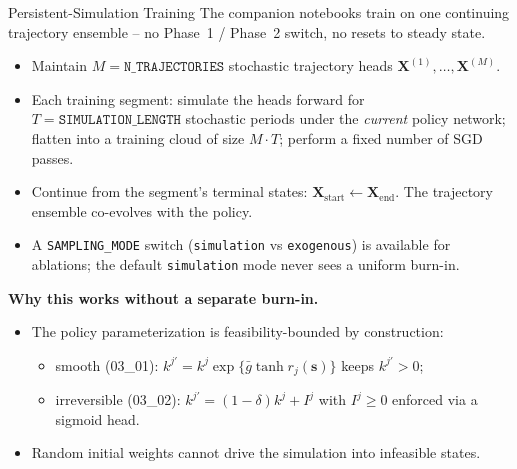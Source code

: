 \documentclass[aspectratio=169,11pt]{beamer}
\newcommand{\emphc}[1]{\textcolor{harvardcrimson}{#1}}
\begin{document}
\begin{frame}{Persistent-Simulation Training}
The companion notebooks train on \emphc{one continuing trajectory ensemble} -- no Phase~1 / Phase~2 switch, no resets to steady state.

\vspace{0.15em}
\begin{itemize}
    \item Maintain $M = \texttt{N\_TRAJECTORIES}$ stochastic trajectory heads $\bm{X}^{(1)}, \ldots, \bm{X}^{(M)}$.
    \item Each \emphc{training segment}: simulate the heads forward for $T = \texttt{SIMULATION\_LENGTH}$ stochastic periods under the \emph{current} policy network; flatten into a training cloud of size $M\!\cdot\!T$; perform a fixed number of SGD passes.
    \item Continue from the segment's terminal states: $\bm{X}_{\mathrm{start}} \leftarrow \bm{X}_{\mathrm{end}}$. The trajectory ensemble \emphc{co-evolves} with the policy.
    \item A \texttt{SAMPLING\_MODE} switch (\texttt{simulation} vs \texttt{exogenous}) is available for ablations; the default \texttt{simulation} mode never sees a uniform burn-in.
\end{itemize}

\vspace{0.15em}
\textbf{Why this works without a separate burn-in.}
\begin{itemize}
    \item The policy parameterization is feasibility-bounded by construction:
    \begin{itemize}\itemsep1pt
        \item smooth (03\_01): $k^{j\prime} = k^j \exp\{\bar g \tanh r_j(\bm{s})\}$ keeps $k^{j\prime} > 0$;
        \item irreversible (03\_02): $k^{j\prime} = (1-\delta)k^j + I^j$ with $I^j \ge 0$ enforced via a sigmoid head.
    \end{itemize}
    \item Random initial weights cannot drive the simulation into infeasible states.
\end{itemize}
\end{frame}
\end{document}

